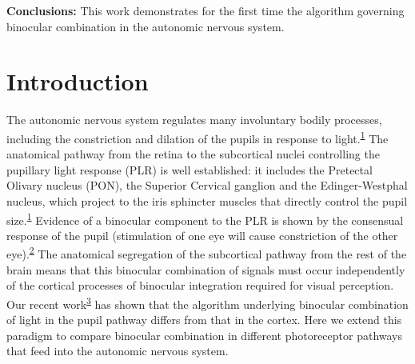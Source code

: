 \documentclass[
]{article}
\begin{document}
\textbf{Conclusions:} This work demonstrates for the first time the algorithm governing binocular combination in the autonomic nervous system.

\hypertarget{introduction}{%
\section{Introduction}\label{introduction}}

The autonomic nervous system regulates many involuntary bodily processes, including the constriction and dilation of the pupils in response to light.\textsuperscript{\protect\hyperlink{ref-McDougal2015}{1}} The anatomical pathway from the retina to the subcortical nuclei controlling the pupillary light response (PLR) is well established: it includes the Pretectal Olivary nucleus (PON), the Superior Cervical ganglion and the Edinger-Westphal nucleus, which project to the iris sphincter muscles that directly control the pupil size.\textsuperscript{\protect\hyperlink{ref-McDougal2015}{1}} Evidence of a binocular component to the PLR is shown by the consensual response of the pupil (stimulation of one eye will cause constriction of the other eye).\textsuperscript{\protect\hyperlink{ref-Wyatt1981}{2}} The anatomical segregation of the subcortical pathway from the rest of the brain means that this binocular combination of signals must occur independently of the cortical processes of binocular integration required for visual perception. Our recent work\textsuperscript{\protect\hyperlink{ref-Segala2023}{3}} has shown that the algorithm underlying binocular combination of light in the pupil pathway differs from that in the cortex. Here we extend this paradigm to compare binocular combination in different photoreceptor pathways that feed into the autonomic nervous system.
\end{document}
